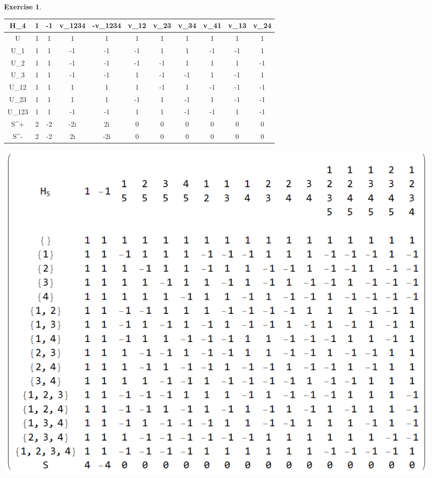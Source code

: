 \documentclass[12pt, letterpaper]{article}
\theoremstyle{definition}
\theoremstyle{remark}
\theoremstyle{definition}
\newtheorem{exe}{Exercise}[section]
\theoremstyle{plain}
\numberwithin{equation}{section}
\begin{document}
\begin{exe}
\begin{center}
\begin{tabular}{C | C C C C C C C C C C }
				H_4& 1 & -1 & v_{1234} & -v_{1234} & v_{12}  & v_{23} &  v_{34} & v_{41} & v_{13} & v_{24} \\
				\hline
				U & 1 & 1 & 1 & 1 & 1 &1&1&1&1&1\\
				U_1 & 1 & 1 &   -1&       -1&          -1&       1     &   1    &   -1     & -1      & 1\\
				U_2 & 1 & 1 & -1&        -1&          -1&       -1    &  1     &  1      & 1      &-1\\
				U_3 & 1 & 1 & -1&        -1&           1&    -1       & -1     & 1       & -1     &1\\
				U_{12}& 1 & 1 &  1&       1&           1&      -1     & 1      &-1       & -1     &-1\\
				U_{23}& 1 & 1 &  1&       1&          -1&       1     &-1      &1        & -1     &-1\\
				U_{123}&1 & 1 & -1&      -1&           1&        1    &    -1  &   -1    &     1  &-1\\
				S^+ & 2 & -2 & -2i & 2i & 0&0&0&0&0&0\\ 
				S^- & 2 & -2 & 2i & -2i & 0&0&0&0&0&0\\ 		
			\end{tabular}
		\end{center}
	
		\includegraphics[scale=0.6]{CharacterTable_H5}
		

\end{exe}
\end{document}
